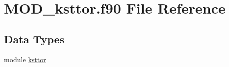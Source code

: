 \hypertarget{MOD__ksttor_8f90}{\section{M\-O\-D\-\_\-ksttor.\-f90 File Reference}
\label{MOD__ksttor_8f90}
}
\subsection*{Data Types}
\begin{DoxyCompactItemize}
\item 
module \hyperlink{classksttor}{ksttor}
\end{DoxyCompactItemize}
